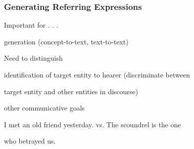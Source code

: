\documentclass[compress,color=usenames]{beamer}
\begin{document}
\begin{frame}
\frametitle{
Generating Referring Expressions}






Important for . . .



generation (concept-to-text, text-to-text)



Need to distinguish



identiﬁcation of target entity to hearer (discriminate between



target entity and other entities in discourse)



other communicative goals



I met an old friend yesterday. vs. The scoundrel is the one



who betrayed us.










\end{frame}
\end{document}
